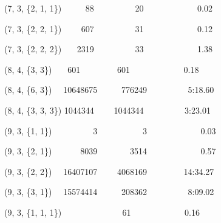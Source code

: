 \documentclass{article}
\newenvironment{tmparmod}[3]{\begin{list}{}{\setlength{\topsep}{0pt}\setlength{\leftmargin}{#1}\setlength{\rightmargin}{#2}\setlength{\parindent}{#3}\setlength{\listparindent}{\parindent}\setlength{\itemindent}{\parindent}\setlength{\parsep}{\parskip}} \item[]}{\end{list}}
\begin{document}
\begin{tmparmod}{0pt}{0pt}{0tab}
\begin{tmbothlined}
{{    {\hspace{3em}}(7, 3, \{2, 1, 1\}) \ \ \ \ \ {\hspace{4em}}88 \ \ \ \ \ \ \
    \ \ 20 \ \ \ \ \ \ \ \ \ \ \ \ 0.02
    
    {\hspace{3em}}(7, 3, \{2, 2, 1\}) \ \ \ \ {\hspace{4em}}607 \ \ \ \ \ \ \
    \ \ 31 \ \ \ \ \ \ \ \ \ \ \ \ 0.12
    
    {\hspace{3em}}(7, 3, \{2, 2, 2\}) \ \ \ {\hspace{4em}}2319 \ \ \ \ \ \ \ \
    \ 33 \ \ \ \ \ \ \ \ \ \ \ \ 1.38
    
    {\hspace{3em}}(8, 4, \{3, 3\}) \ \ \ {\hspace{6em}}601 \ \ \ \ \ \ \ \ 601
    \ \ \ \ \ \ \ \ \ \ \ \ 0.18
    
    {\hspace{3em}}(8, 4, \{6, 3\}) \ \ {\hspace{4em}}10648675 \ \ \ \ \ 776249
    \ \ \ \ \ \ \ \ \ 5:18.60
    
    {\hspace{3em}}(8, 4, \{3, 3, 3\}) {\hspace{4em}}1044344 \ \ \ \ 1044344 \
    \ \ \ \ \ \ \ \ 3:23.01
    
    {\hspace{3em}}(9, 3, \{1, 1\}) \ \ \ \ \ \ \ \ \ {\hspace{4em}}3 \ \ \ \ \
    \ \ \ \ \ 3 \ \ \ \ \ \ \ \ \ \ \ \ 0.03
    
    {\hspace{3em}}(9, 3, \{2, 1\}) \ \ \ \ \ \ {\hspace{4em}}8039 \ \ \ \ \ \
    \ 3514 \ \ \ \ \ \ \ \ \ \ \ \ 0.57
    
    {\hspace{3em}}(9, 3, \{2, 2\}) \ \ {\hspace{4em}}16407107 \ \ \ \ 4068169
    \ \ \ \ \ \ \ \ 14:34.27
    
    {\hspace{3em}}(9, 3, \{3, 1\}) \ \ {\hspace{4em}}15574414 \ \ \ \ \ 208362
    \ \ \ \ \ \ \ \ \ 8:09.02
    
    {\hspace{3em}}(9, 3, \{1, 1, 1\}) \ \ \ \ {\hspace{3em}} \quad 61 \ \ \ \
    \ \ \ \ \ 61 \ \ \ \ \ \ \ \ \ \ \ \ 0.16
    
}}
\end{tmbothlined}
\end{tmparmod}
\end{document}
